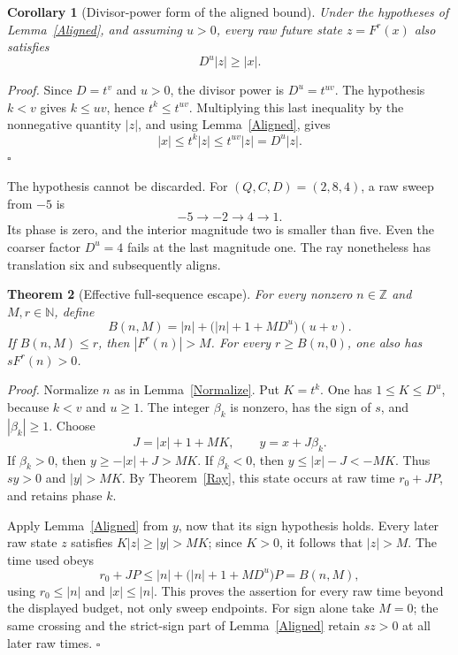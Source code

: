 \documentclass[11pt,letterpaper]{article}
\newcommand{\N}{\mathbb{N}}
\newcommand{\Z}{\mathbb{Z}}
\newtheorem{theorem}{Theorem}
\newtheorem{corollary}[theorem]{Corollary}
\newenvironment{proof}{\noindent\textit{Proof.}}{\hfill\(\square\)}
\begin{document}
\begin{corollary}[Divisor-power form of the aligned bound]\label{AlignedDivisor}
Under the hypotheses of Lemma~\ref{Aligned}, and assuming \(u>0\), every raw
future state \(z=F^r(x)\) also satisfies
\[
D^u|z|\ge|x|.
\]
\end{corollary}
\begin{proof}
Since \(D=t^v\) and \(u>0\), the divisor power is \(D^u=t^{uv}\). The
hypothesis \(k<v\) gives \(k\le uv\), hence \(t^k\le t^{uv}\). Multiplying
this last inequality by the nonnegative quantity \(|z|\), and using
Lemma~\ref{Aligned}, gives
\[
|x|\le t^k|z|\le t^{uv}|z|=D^u|z|.
\]
\end{proof}

The hypothesis cannot be discarded. For \((Q,C,D)=(2,8,4)\), a raw sweep
from \(-5\) is
\[
-5\longrightarrow-2\longrightarrow4\longrightarrow1.
\]
Its phase is zero, and the interior magnitude two is smaller than five.
Even the coarser factor \(D^u=4\) fails at the last magnitude one.
The ray nonetheless has translation six and subsequently aligns.

\begin{theorem}[Effective full-sequence escape]\label{Escape}
For every nonzero \(n\in\Z\) and \(M,r\in\N\), define
\[
B(n,M)=|n|+\bigl(|n|+1+MD^u\bigr)(u+v).
\]
If \(B(n,M)\le r\), then \(|F^r(n)|>M\).
For every \(r\ge B(n,0)\), one also has \(sF^r(n)>0\).
\end{theorem}
\begin{proof}
Normalize \(n\) as in Lemma~\ref{Normalize}. Put \(K=t^k\).
One has \(1\le K\le D^u\), because \(k<v\) and \(u\ge1\).
The integer \(\beta_k\) is nonzero, has the sign of \(s\), and
\(|\beta_k|\ge1\). Choose
\[
J=|x|+1+MK,\qquad y=x+J\beta_k.
\]
If \(\beta_k>0\), then \(y\ge-|x|+J>MK\).
If \(\beta_k<0\), then \(y\le|x|-J<-MK\).
Thus \(sy>0\) and \(|y|>MK\). By Theorem~\ref{Ray}, this state occurs
at raw time \(r_0+JP\), and retains phase \(k\).

Apply Lemma~\ref{Aligned} from \(y\), now that its sign hypothesis holds.
Every later raw state \(z\) satisfies \(K|z|\ge|y|>MK\);
since \(K>0\), it follows that \(|z|>M\).
The time used obeys
\[
r_0+JP\le |n|+\bigl(|n|+1+MD^u\bigr)P=B(n,M),
\]
using \(r_0\le|n|\) and \(|x|\le|n|\). This proves the assertion for
every raw time beyond the displayed budget, not only sweep endpoints.
For sign alone take \(M=0\); the same crossing and the strict-sign part of
Lemma~\ref{Aligned} retain \(sz>0\) at all later raw times.
\end{proof}
\end{document}
